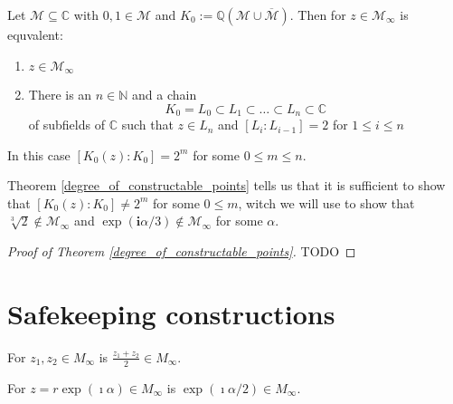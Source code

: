 \begin{theorem}
\label{degree_of_constructable_points}
    Let $\mathcal{M}\subseteq\mathbb{C}$ with $0,1 \in \mathcal{M}$ and $K_0 := \mathbb{Q}(\mathcal{M}\cup \overline{\mathcal{M}})$.
    Then for $z \in \mathcal{M}_{\infty}$ is equvalent:
    \begin{enumerate}
        \item $z \in \mathcal{M}_{\infty}$
        \item There is an $n \in \mathbb{N}$ and a chain \begin{equation*}
            K_0 = L_0 \subset L_1 \subset \dots \subset L_n \subset \mathbb{C}
        \end{equation*}
        of subfields of $\mathbb{C}$ such that $z \in L_n$ and $[L_i:L_{i-1}] =2$ for $1\le i\le n$ %
    \end{enumerate}
    In this case $[K_0(z):K_0] = 2^m$ for some $0 \le m \le n$.
\end{theorem}
\begin{remark}
    Theorem \ref{degree_of_constructable_points} tells us that it is sufficient to show that $[K_0(z):K_0] \ne 2^m$ for some $0 \le m $, witch we will use to show that $\sqrt[3]{2} \notin \mathcal{M}_{\infty}$ and $\exp(\textbf{i} \alpha/3) \notin \mathcal{M}_{\infty}$ for some $\alpha$.
\end{remark}
\begin{proof}[Proof of Theorem \ref{degree_of_constructable_points}]
    TODO %
\end{proof}

\section{Safekeeping constructions}

\begin{lemma}
    \label{construction_midpoint}
    For $z_1, z_2 \in M_{\infty}$ is $\frac{z_1 + z_2}{2} \in M_{\infty}$.
\end{lemma}

\begin{lemma}
    \label{lem:construction_halving_angle}
    For $z = r \exp(\imath \alpha) \in M_{\infty}$ is $\exp(\imath \alpha / 2) \in M_{\infty}$.
\end{lemma}

